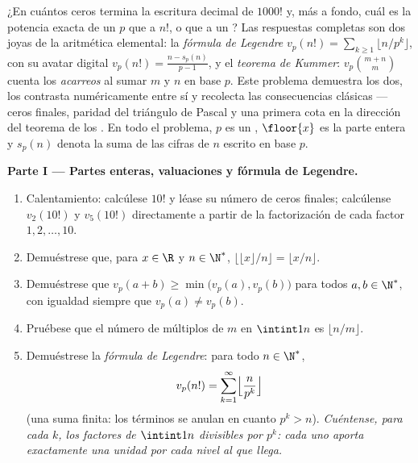 \begin{problem}\label{pb:b1:arith:1}
¿En cuántos ceros termina la escritura decimal de $1000!$ y, más a
fondo, cuál es la potencia exacta de un  $p$ que  a $n!$, o
que  a un ? Las respuestas completas son dos
joyas de la aritmética elemental: la \emph{fórmula de Legendre}
 $v_p(n!) = \sum_{k\geq1}
\lfloor n/p^k \rfloor$, con su avatar digital $v_p(n!) = \frac{n
- s_p(n)}{p-1}$, y el \emph{teorema de Kummer}: $v_p\binom{m+n}m$ cuenta los \emph{acarreos} al sumar $m$ y
$n$ en base $p$. Este problema demuestra los dos, los contrasta
numéricamente entre sí y recolecta las consecuencias clásicas ---
ceros finales, paridad del triángulo de Pascal y una primera cota en
la dirección del teorema de los .
En todo el problema, $p$ es un , $\floor{x}$ es la parte entera y
$s_p(n)$ denota la suma de las cifras de $n$ escrito en base $p$.

\medskip
\noindent\textbf{Parte I --- Partes enteras, valuaciones y fórmula de
Legendre.}
\begin{enumerate}
  \item Calentamiento: calcúlese $10!$ y léase su número de ceros
        finales; calcúlense $v_2(10!)$ y $v_5(10!)$ directamente a
        partir de la factorización de cada factor $1, 2, \dots, 10$.
  \item Demuéstrese que, para $x \in \R$ y $n \in \N^*$,
        $\bigl\lfloor \lfloor x \rfloor / n \bigr\rfloor =
        \lfloor x/n \rfloor$.
  \item Demuéstrese que $v_p(a + b) \geq \min\bigl(v_p(a),
        v_p(b)\bigr)$ para todos $a, b \in \N^*$, con igualdad
        siempre que $v_p(a) \neq v_p(b)$.
  \item Pruébese que el número de múltiplos de $m$ en $\intint1n$ es
        $\lfloor n/m \rfloor$.
  \item Demuéstrese la \emph{fórmula de Legendre}: para todo
        $n \in \N^*$,
        \[
        v_p(n!) = \sum_{k=1}^{\infty}
        \Bigl\lfloor \frac{n}{p^k} \Bigr\rfloor
        \]
        (una suma finita: los términos se anulan en cuanto
        $p^k > n$). \emph{Cuéntense, para cada $k$, los factores de
        $\intint1n$ divisibles por $p^k$: cada uno aporta exactamente
        una unidad por cada nivel al que llega.}
\end{enumerate}


\end{problem}
